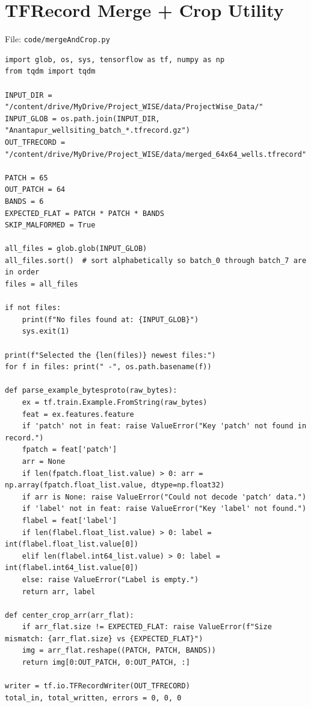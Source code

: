 \documentclass[12pt,a4paper]{report}
\begin{document}
\section{TFRecord Merge + Crop Utility}
\begin{wiseNote}
File: \texttt{code/mergeAndCrop.py}
\end{wiseNote}
\lstset{style=wise,language=Python}
\begin{lstlisting}
import glob, os, sys, tensorflow as tf, numpy as np
from tqdm import tqdm

INPUT_DIR = "/content/drive/MyDrive/Project_WISE/data/ProjectWise_Data/"
INPUT_GLOB = os.path.join(INPUT_DIR, "Anantapur_wellsiting_batch_*.tfrecord.gz")
OUT_TFRECORD = "/content/drive/MyDrive/Project_WISE/data/merged_64x64_wells.tfrecord"

PATCH = 65
OUT_PATCH = 64
BANDS = 6
EXPECTED_FLAT = PATCH * PATCH * BANDS
SKIP_MALFORMED = True

all_files = glob.glob(INPUT_GLOB)
all_files.sort()  # sort alphabetically so batch_0 through batch_7 are in order
files = all_files

if not files:
    print(f"No files found at: {INPUT_GLOB}")
    sys.exit(1)

print(f"Selected the {len(files)} newest files:")
for f in files: print(" -", os.path.basename(f))

def parse_example_bytesproto(raw_bytes):
    ex = tf.train.Example.FromString(raw_bytes)
    feat = ex.features.feature
    if 'patch' not in feat: raise ValueError("Key 'patch' not found in record.")
    fpatch = feat['patch']
    arr = None
    if len(fpatch.float_list.value) > 0: arr = np.array(fpatch.float_list.value, dtype=np.float32)
    if arr is None: raise ValueError("Could not decode 'patch' data.")
    if 'label' not in feat: raise ValueError("Key 'label' not found.")
    flabel = feat['label']
    if len(flabel.float_list.value) > 0: label = int(flabel.float_list.value[0])
    elif len(flabel.int64_list.value) > 0: label = int(flabel.int64_list.value[0])
    else: raise ValueError("Label is empty.")
    return arr, label

def center_crop_arr(arr_flat):
    if arr_flat.size != EXPECTED_FLAT: raise ValueError(f"Size mismatch: {arr_flat.size} vs {EXPECTED_FLAT}")
    img = arr_flat.reshape((PATCH, PATCH, BANDS))
    return img[0:OUT_PATCH, 0:OUT_PATCH, :]

writer = tf.io.TFRecordWriter(OUT_TFRECORD)
total_in, total_written, errors = 0, 0, 0


\end{lstlisting}
\end{document}

